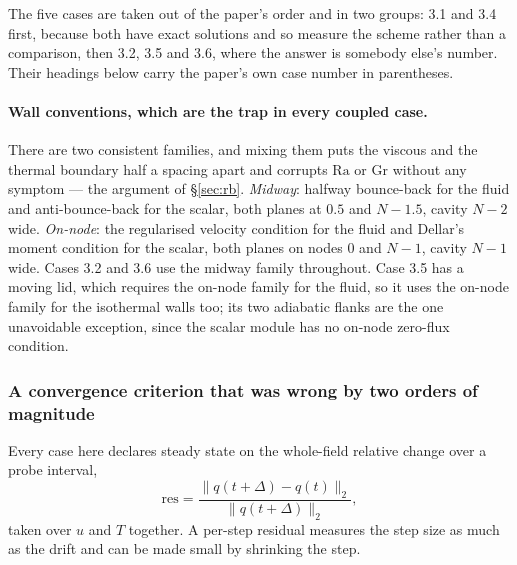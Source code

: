 \documentclass[11pt,a4paper]{article}
\begin{document}
The five cases are taken out of the paper's order and in two groups: 3.1 and 3.4
first, because both have exact solutions and so measure the scheme rather than a
comparison, then 3.2, 3.5 and 3.6, where the answer is somebody else's number.
Their headings below carry the paper's own case number in parentheses.

\paragraph{Wall conventions, which are the trap in every coupled case.} There
are two consistent families, and mixing them puts the viscous and the thermal
boundary half a spacing apart and corrupts $\mathrm{Ra}$ or $\mathrm{Gr}$ without
any symptom --- the argument of \S\ref{sec:rb}. \emph{Midway}: halfway
bounce-back for the fluid and anti-bounce-back for the scalar, both planes at
$0.5$ and $N-1.5$, cavity $N-2$ wide. \emph{On-node}: the regularised velocity
condition for the fluid and Dellar's moment condition for the scalar, both
planes on nodes $0$ and $N-1$, cavity $N-1$ wide. Cases 3.2 and 3.6 use the
midway family throughout. Case 3.5 has a moving lid, which requires the on-node
family for the fluid, so it uses the on-node family for the isothermal walls
too; its two adiabatic flanks are the one unavoidable exception, since the scalar
module has no on-node zero-flux condition.

\subsubsection{A convergence criterion that was wrong by two orders of magnitude}
\label{sec:zhoudrift}

Every case here declares steady state on the whole-field relative change over a
probe interval,
\begin{equation}
  \mathrm{res} = \frac{\|q(t+\Delta) - q(t)\|_2}{\|q(t+\Delta)\|_2},
\end{equation}
taken over $u$ and $T$ together. A per-step
residual measures the step size as much as the drift and can be made small by
shrinking the step.
\end{document}
